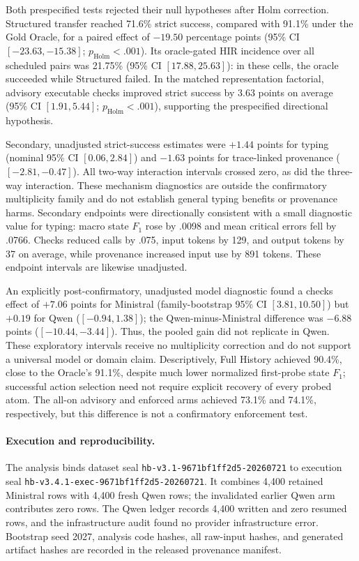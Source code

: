 Both prespecified tests rejected their null hypotheses after Holm correction.
Structured transfer reached 71.6\% strict success, compared with 91.1\% under
the Gold Oracle, for a paired effect of $-19.50$ percentage points (95\% CI
$[-23.63,-15.38]$; $p_{\mathrm{Holm}}<.001$). Its oracle-gated HIR incidence
over all scheduled pairs was 21.75\% (95\% CI $[17.88,25.63]$): in these cells,
the oracle succeeded while Structured failed. In the matched representation factorial, advisory
executable checks improved strict success by 3.63 points on average (95\% CI
$[1.91,5.44]$; $p_{\mathrm{Holm}}<.001$), supporting the prespecified
directional hypothesis.

Secondary, unadjusted strict-success estimates were $+1.44$ points for typing
(nominal 95\% CI $[0.06,2.84]$) and $-1.63$ points for trace-linked provenance
($[-2.81,-0.47]$). All two-way interaction intervals crossed zero, as did the
three-way interaction. These mechanism diagnostics are outside the
confirmatory multiplicity family and do not establish general typing benefits
or provenance harms. Secondary endpoints were directionally consistent with a
small diagnostic value for typing: macro state $F_1$ rose by .0098 and mean
critical errors fell by .0766. Checks reduced calls by .075, input tokens by
129, and output tokens by 37 on average, while provenance increased input use
by 891 tokens. These endpoint intervals are likewise unadjusted.

An explicitly post-confirmatory, unadjusted model diagnostic found a checks
effect of $+7.06$ points for Ministral (family-bootstrap 95\% CI
$[3.81,10.50]$) but $+0.19$ for Qwen ($[-0.94,1.38]$); the Qwen-minus-Ministral
difference was $-6.88$ points ($[-10.44,-3.44]$). Thus, the pooled gain did not
replicate in Qwen. These exploratory intervals receive no multiplicity
correction and do not support a universal model or domain claim. Descriptively, Full
History achieved 90.4\%, close to the Oracle's 91.1\%, despite much lower
normalized first-probe state $F_1$; successful action selection need not require
explicit recovery of every probed atom. The all-on advisory and enforced arms
achieved 73.1\% and 74.1\%, respectively, but this difference is not a
confirmatory enforcement test.

\paragraph{Execution and reproducibility.}
The analysis binds dataset seal
\texttt{hb-v3.1-9671bf1ff2d5-20260721} to execution seal
\texttt{hb-v3.4.1-exec-9671bf1ff2d5-20260721}. It combines 4,400 retained
Ministral rows with 4,400 fresh Qwen rows; the invalidated earlier Qwen arm
contributes zero rows. The Qwen ledger records 4,400 written and zero resumed
rows, and the infrastructure audit found no provider infrastructure error.
Bootstrap seed 2027, analysis code hashes, all raw-input hashes, and generated
artifact hashes are recorded in the released provenance manifest.
